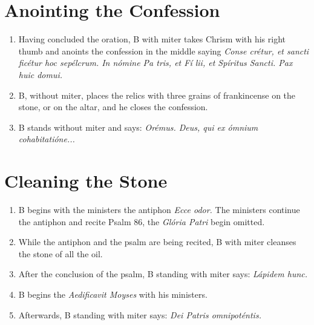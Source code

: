 \documentclass[twocolumn]{report}
\begin{document}
\section{Anointing the Confession}
\begin{enumerate}
	\item Having concluded the oration, B with miter takes Chrism with his right thumb and anoints the confession in the middle saying \textit{Conse  crétur, et sancti  ficétur hoc sepélcrum. In nómine Pa  tris, et Fí  lii, et Spíritus  Sancti. Pax huic domui.}
	\item B, without miter, places the relics with three grains of frankincense on the stone, or on the altar, and he closes the confession.
	\item B stands without miter and says: \textit{Orémus. Deus, qui ex ómnium cohabitatióne...}
\end{enumerate}
\section{Cleaning the Stone}
\begin{enumerate}
	\item B begins with the ministers the antiphon \textit{Ecce odor.} The ministers continue the antiphon and recite Psalm 86, the \textit{Glória Patri} begin omitted.
	\item While the antiphon and the psalm are being recited, B with miter cleanses the stone of all the oil.
	\item After the conclusion of the psalm, B standing with miter says: \textit{Lápidem hunc.}
	\item B begins the \textit{Aedificavit Moyses} with his ministers.
	\item Afterwards, B standing with miter says: \textit{Dei Patris omnipoténtis.}
\end{enumerate}
\end{document}
